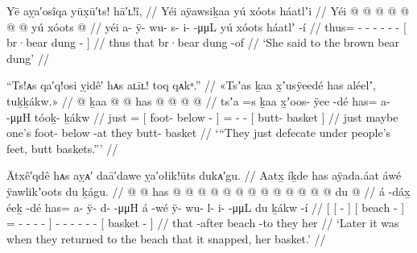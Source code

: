 \ex\label{ex:89-5-said-to-the-dung}%
%
\begingl
	\glpreamble	Yē aỵa′osîqa yūx̣ū′ts! hā′ʟ!î, //
	\glpreamble	Yéi aÿawsiḵaa yú xóots háatlʼi //
	\gla	Yéi @  @ {} @ {} @ {} @ {} @ {} @ {}
		{} yú xóots  @ {} {} //
	\glb	yéi a- ÿ- wu- s- i-  -μμL
		{} yú xóots háatlʼ -í {} //
	\glc	thus= - - - - -  -
		{}[  br·bear dung - {}] //
	\gld	thus  {} {} {} {} {} {}
		{} that br·bear dung -of {} //
	\glft	‘She said to the brown bear dung’
		//
\endgl
\xe

\ex\label{ex:89-6-basket-butts}%
%
\begingl
	\glpreamble	“Ts!ᴀs qa′q!osi ỵidê′ hᴀs aʟīʟ! toq qᴀkᵘ.” //
	\glpreamble	«\!Tsʼas ḵaa x̱ʼusÿeedé has aléelʼ, tuḵḵákw.\!» //
	\gla	{} @ {} 
		{} ḵaa  @ {} @ {} {}
		has @  @ {} @ {}
		{}  @ {} {} //
	\glb	\pqp{}tsʼa =s
		{} ḵaa x̱ʼoos- ÿee -dé {}
		has= a-  -μμH
		{} tóoḵ- ḵákw {} //
	\glc	\pqp{}just =
		{}[  foot- below - {}]
		= -  -
		{}[ butt- basket {}] //
	\gld	\pqp{}just \•maybe
		{} one’s foot- below -at {}
		they  {} {}
		{} butt- basket {} //
	\glft	‘“They just defecate under people’s feet, butt baskets.”’
		//
\endgl
\xe

\ex\label{ex:89-7-basket-broke}%
%
\begingl
	\glpreamble	Ātxê′qdê hᴀs aỵᴀ′ daā′dawe ỵa′ołik!ūts dukᴀ′gu. //
	\glpreamble	Aatx̱ íḵde has aÿada.áat áwé ÿawlikʼoots du ḵágu. //
	\gla	{} {}  @ {} {}
			{}  @ {} {}
			has @  @ {} @ {} @ {} @ {} @ {} @ {} {}
		 @ {}
		 @ {} @ {} @ {} @ {} @ {}
		{} du  @ {} {} //
	\glb	{} {} á -dáx̱ {}
			{} éeḵ -dé {}
			has= a- ÿ- {} d-  -μμH {} {}
		á -wé
		ÿ- wu- l- i-  -μμL
		{} du ḵákw -í {} //
	\glc	{}[ {}[  - {}]
			{}[ beach - {}]
			= - - \· -
				 - \· {}]
		 -
		- - - -  -
		{}[  basket - {}] //
	\gld	{} {} that -after {}
			{} beach -to {}
			they  {} {} {} {} {} {} {}
		 {}
		 {} {} {} {} {}
		{} her  {} {} //
	\glft	‘Later it was when they returned to the beach that it snapped, her basket.’
		//
\endgl
\xe

